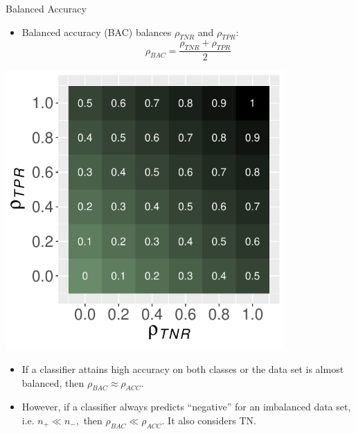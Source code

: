 \documentclass[11pt,compress,t,notes=noshow, xcolor=table]{beamer}
\begin{document}
\begin{frame}{Balanced Accuracy}
	\footnotesize{
	
    	\begin{minipage}[c]{0.49\textwidth}
    		\begin{itemize}
    			\item Balanced accuracy (BAC) balances $\rho_{TNR}$ and $\rho_{TPR}$: 
    			$$\rho_{BAC} = \frac{\rho_{TNR} + \rho_{TPR}}{2}$$

    		\end{itemize}
    	\end{minipage}
    	\begin{minipage}[c]{0.49\textwidth}
    		\centering
    		\includegraphics[width=0.8\textwidth]{figure/bac_plot.pdf}
    	\end{minipage}

    	\begin{itemize}
    		\item If a classifier attains high accuracy on both classes or the data set is almost balanced, then $\rho_{BAC} \approx \rho_{ACC}$.
            \vspace{20pt}
            
    		\item However, if a classifier always predicts ``negative'' for an imbalanced data set, i.e. $n_+  \ll n_-,$ then $\rho_{BAC} \ll \rho_{ACC}$. It also considers TN.
    
    	\end{itemize}
    }
\end{frame}
\end{document}
